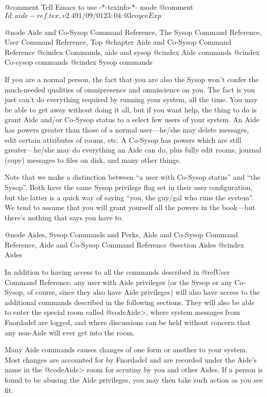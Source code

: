 @comment Tell Emacs to use -*-texinfo-*- mode
@comment $Id: aide-ref.tex,v 2.4 91/09/01 23:04:03 royce Exp $

@node Aide and Co-Sysop Command Reference, The Sysop Command Reference, User Command Reference, Top
@chapter Aide and Co-Sysop Command Reference
@cindex Commands, aide and sysop
@cindex Aide commands
@cindex Co-sysop commands
@cindex Sysop commands

If you are a normal person, the fact that you are also the Sysop won't
confer the much-needed qualities of omnipresence and omniscience on you.  The
fact is you just can't do everything required by running your system, all the
time.  You may be able to get away without doing it all, but if you want help,
the thing to do is grant Aide and/or Co-Sysop status to a select few users of
your system.  An Aide has powers greater than those of a normal user---he/she
may delete messages, edit certain attributes of rooms, etc.  A
Co-Sysop has powers which are still greater---he/she may do everything an Aide
can do, plus fully edit rooms,
journal (copy) messages to files on disk, and many other things.

Note that we make a distinction between ``a user with Co-Sysop status'' and
``the Sysop''.  Both have the same Sysop privilege flag set in their user
configuration, but the latter is a quick way of saying ``you, the guy/gal who
runs the system''.  We tend to assume that you will grant yourself all the
powers in the book---but there's nothing that says you have to.

@node Aides, Sysop Commands and Perks, Aide and Co-Sysop Command Reference, Aide and Co-Sysop Command Reference
@section Aides
@cindex Aides

In addition to having access to all the commands described in
@ref{User Command Reference},
any user with Aide privileges (or the Sysop or any Co-Sysop, of course, since
they also have Aide privileges) will also have access to the additional
commands described in the following sections.  They will also be able to
enter the special room called @code{Aide>}, where system messages from Fnordadel
are logged, and where discussions can be held without concern that any non-Aide
will ever get into the room.

Many Aide commands causes changes of one form or another to your
system.  Most changes are accounted for by Fnordadel and are recorded under
the Aide's name in the @code{Aide>} room for scrutiny by you and other
Aides.  If a person is found to be abusing the Aide privileges, you may then
take such action as you see fit.

